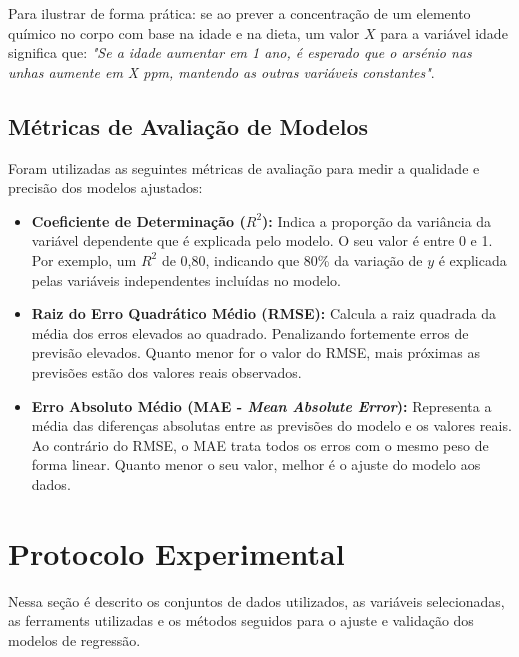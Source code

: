\documentclass{article}
\begin{document}
Para ilustrar de forma prática: se ao prever a concentração de um elemento químico no corpo com base na idade e na dieta, um valor $X$ para a variável idade significa que: \textit{"Se a idade aumentar em 1 ano, é esperado que o arsénio nas unhas aumente em X ppm, mantendo as outras variáveis constantes"}.

\subsection{Métricas de Avaliação de Modelos}
Foram utilizadas as seguintes métricas de avaliação para medir a qualidade e precisão dos modelos ajustados:

\begin{itemize}
    \item \textbf{Coeficiente de Determinação ($R^2$):} Indica a proporção da variância da variável dependente que é explicada pelo modelo. O seu valor é entre 0 e 1. Por exemplo, um $R^2$ de 0,80, indicando que 80\% da variação de $y$ é explicada pelas variáveis independentes incluídas no modelo.
    \item \textbf{Raiz do Erro Quadrático Médio (RMSE):} Calcula a raiz quadrada da média dos erros elevados ao quadrado. Penalizando fortemente erros de previsão elevados. Quanto menor for o valor do RMSE, mais próximas as previsões estão dos valores reais observados.
    \item \textbf{Erro Absoluto Médio (MAE - \textit{Mean Absolute Error}):} Representa a média das diferenças absolutas entre as previsões do modelo e os valores reais. Ao contrário do RMSE, o MAE trata todos os erros com o mesmo peso de forma linear. Quanto menor o seu valor, melhor é o ajuste do modelo aos dados.
\end{itemize}

\section{Protocolo Experimental}
Nessa seção é descrito os conjuntos de dados utilizados, as variáveis selecionadas, as ferraments utilizadas e os métodos seguidos para o ajuste e validação dos modelos de regressão.
\end{document}
